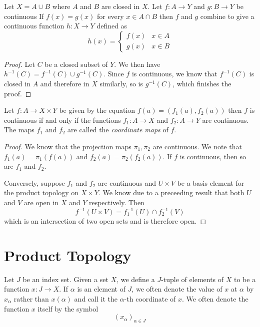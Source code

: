 \begin{lemma}
    Let $X = A\cup B$ where $A$ and $B$ are closed in $X$. Let $f:A\to Y$ and $g:B\to Y$ be continuous If $f(x) = g(x)$ for every $x\in A\cap B$ then $f$ and $g$ combine to give a continuous function $h:X\to Y$ defined as 
    \begin{equation*}
        h(x) =
        \begin{cases}
            f(x) & x\in A\\
            g(x) & x\in B
        \end{cases}
    \end{equation*}
\end{lemma}
\begin{proof}
    Let $C$ be a closed subset of $Y$. We then have $h^{-1}(C) = f^{-1}(C)\cup g^{-1}(C)$. Since $f$ is continuous, we know that $f^{-1}(C)$ is closed in $A$ and therefore in $X$ similarly, so is $g^{-1}(C)$, which finishes the proof.
\end{proof}

\begin{theorem}
    Let $f:A\to X\times Y$ be given by the equation $f(a) = (f_1(a), f_2(a))$ then $f$ is continuous if and only if the functions $f_1:A\to X$ and $f_2:A\to Y$ are continuous. The maps $f_1$ and $f_2$ are called the \textit{coordinate maps} of $f$.
\end{theorem}
\begin{proof}
    We know that the projection maps $\pi_1, \pi_2$ are continuous. We note that $f_1(a) = \pi_1(f(a))$ and $f_2(a) = \pi_2(f_2(a))$. If $f$ is continuous, then so are $f_1$ and $f_2$.

    Conversely, suppose $f_1$ and $f_2$ are continuous and $U\times V$ be a basis element for the product topology on $X\times Y$. We know due to a preceeding result that both $U$ and $V$ are open in $X$ and $Y$ respectively. Then 
    \begin{equation*}
        f^{-1}(U\times V) = f_1^{-1}(U)\cap f_2^{-1}(V)
    \end{equation*}
    which is an intersection of two open sets and is therefore open.
\end{proof}

\section{Product Topology}
\begin{definition}
    Let $J$ be an index set. Given a set $X$, we define a $J$-tuple of elements of $X$ to be a function $x:J\to X$. If $\alpha$ is an element of $J$, we often denote the value of $x$ at $\alpha$ by $x_\alpha$ rather than $x(\alpha)$ and call it the $\alpha$-th coordinate of $x$. We often denote the function $x$ itself by the symbol
    \begin{equation*}
        (x_\alpha)_{\alpha\in J}
    \end{equation*}
\end{definition}

